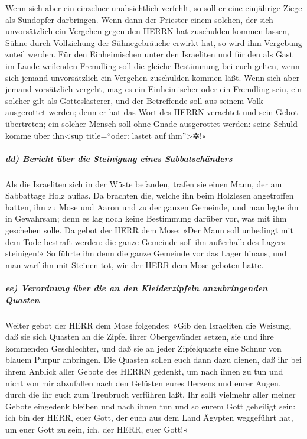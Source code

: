 Wenn sich aber ein einzelner unabsichtlich verfehlt, so
soll er eine einjährige Ziege als Sündopfer darbringen.
Wenn dann der Priester einem solchen, der sich
unvorsätzlich ein Vergehen gegen den HERRN hat zuschulden kommen lassen,
Sühne durch Vollziehung der Sühnegebräuche erwirkt hat, so wird ihm
Vergebung zuteil werden. Für den Einheimischen unter den
Israeliten und für den als Gast im Lande weilenden Fremdling soll die
gleiche Bestimmung bei euch gelten, wenn sich jemand unvorsätzlich ein
Vergehen zuschulden kommen läßt. Wenn sich aber jemand
vorsätzlich vergeht, mag es ein Einheimischer oder ein Fremdling sein,
ein solcher gilt als Gotteslästerer, und der Betreffende soll aus seinem
Volk ausgerottet werden; denn er hat das Wort des HERRN
verachtet und sein Gebot übertreten; ein solcher Mensch soll ohne Gnade
ausgerottet werden: seine Schuld komme über ihn\textless sup
title=``oder: lastet auf ihm''\textgreater✲!«

\hypertarget{dd-bericht-uxfcber-die-steinigung-eines-sabbatschuxe4nders}{%
\subparagraph{dd) Bericht über die Steinigung eines
Sabbatschänders}\label{dd-bericht-uxfcber-die-steinigung-eines-sabbatschuxe4nders}}

Als die Israeliten sich in der Wüste befanden, trafen sie
einen Mann, der am Sabbattage Holz auflas. Da brachten
die, welche ihn beim Holzlesen angetroffen hatten, ihn zu Mose und Aaron
und zu der ganzen Gemeinde, und man legte ihn in
Gewahrsam; denn es lag noch keine Bestimmung darüber vor, was mit ihm
geschehen solle. Da gebot der HERR dem Mose: »Der Mann
soll unbedingt mit dem Tode bestraft werden: die ganze Gemeinde soll ihn
außerhalb des Lagers steinigen!« So führte ihn denn die
ganze Gemeinde vor das Lager hinaus, und man warf ihn mit Steinen tot,
wie der HERR dem Mose geboten hatte.

\hypertarget{ee-verordnung-uxfcber-die-an-den-kleiderzipfeln-anzubringenden-quasten}{%
\subparagraph{ee) Verordnung über die an den Kleiderzipfeln
anzubringenden
Quasten}\label{ee-verordnung-uxfcber-die-an-den-kleiderzipfeln-anzubringenden-quasten}}

Weiter gebot der HERR dem Mose folgendes:
»Gib den Israeliten die Weisung, daß sie sich Quasten an
die Zipfel ihrer Obergewänder setzen, sie und ihre kommenden
Geschlechter, und daß sie an jeder Zipfelquaste eine Schnur von blauem
Purpur anbringen. Die Quasten sollen euch dann dazu
dienen, daß ihr bei ihrem Anblick aller Gebote des HERRN gedenkt, um
nach ihnen zu tun und nicht von mir abzufallen nach den Gelüsten eures
Herzens und eurer Augen, durch die ihr euch zum Treubruch verführen
laßt. Ihr sollt vielmehr aller meiner Gebote eingedenk
bleiben und nach ihnen tun und so eurem Gott geheiligt sein:
ich bin der HERR, euer Gott, der euch aus dem Land
Ägypten weggeführt hat, um euer Gott zu sein, ich, der HERR, euer Gott!«

